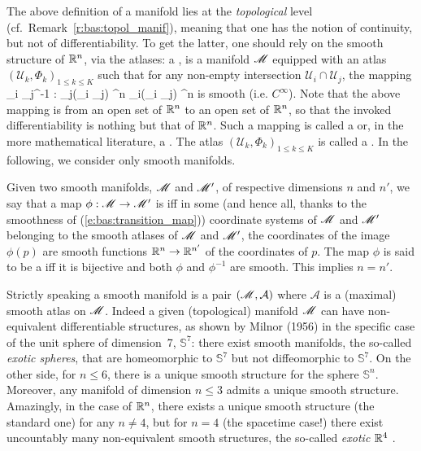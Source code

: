 The above definition of a manifold lies at the \emph{topological} level
(cf.~Remark~\ref{r:bas:topol_manif}), meaning that one has the notion of continuity, but not of differentiability. To get the latter, one should rely on the smooth structure of $\mathbb{R}^n$, via the atlases:
a ,
is a manifold $\mathscr{M}$ equipped with an atlas
$(\mathcal{U}_k,\Phi_k)_{1\leq k \leq K}$ such that for any non-empty intersection
$\mathcal{U}_i \cap \mathcal{U}_j$, the mapping
\be \label{e:bas:transition_map}
    \Phi_i \circ \Phi_j^{-1} : \Phi_j(_i \cap {}_j)
    \subset \R^n \longrightarrow \Phi_i(_i \cap {}_j)
    \subset \R^n
\ee
is smooth (i.e. $C^\infty$).
Note that the above mapping is from an open set of $\mathbb{R}^n$ to an open set of $\mathbb{R}^n$, so that the invoked differentiability is nothing but that of $\mathbb{R}^n$.
Such a mapping is called a  or, in the more mathematical literature, a
.
The atlas $(\mathcal{U}_k,\Phi_k)_{1\leq k \leq K}$ is called a
.
In the following, we consider only smooth manifolds.

Given two smooth manifolds, $\mathscr{M}$ and $\mathscr{M}'$, of
respective dimensions $n$ and $n'$, we say that a map
$\phi : \mathscr{M} \rightarrow \mathscr{M}'$ is  iff in some (and hence all, thanks to the smoothness of (\ref{e:bas:transition_map})) coordinate systems
of $\mathscr{M}$ and $\mathscr{M}'$ belonging to the smooth atlases of $\mathscr{M}$ and $\mathscr{M}'$,
the coordinates of the image $\phi(p)$ are smooth functions $\mathbb{R}^n\rightarrow \mathbb{R}^{n'}$ of the coordinates of $p$.
The map $\phi$ is said to be a  iff
it is bijective and both $\phi$ and $\phi^{-1}$ are smooth. This implies $n=n'$.

\begin{remark}
Strictly speaking a smooth manifold is a pair $(\mathscr{M},\mathcal{A})$  where
$\mathcal{A}$ is a (maximal) smooth atlas on $\mathscr{M}$.
Indeed a given (topological) manifold $\mathscr{M}$
can have non-equivalent differentiable structures, as shown by Milnor (1956) \cite{Milno56}
in the specific case of the unit sphere of dimension~7, $\mathbb{S}^7$: there exist smooth manifolds, the so-called \emph{exotic spheres},
that are homeomorphic to $\mathbb{S}^7$ but not diffeomorphic
to $\mathbb{S}^7$.  On the other side, for $n\leq 6$, there is a unique smooth
structure for the sphere $\mathbb{S}^n$.
Moreover, any manifold of dimension $n\leq 3$ admits a unique smooth structure.
Amazingly, in the case of $\mathbb{R}^n$, there exists a unique smooth structure (the standard one) for any $n\not=4$, but for $n=4$ (the spacetime case!) there exist uncountably many non-equivalent smooth structures, the so-called
\emph{exotic $\mathbb{R}^4$} \cite{Taube87}.
\end{remark}

